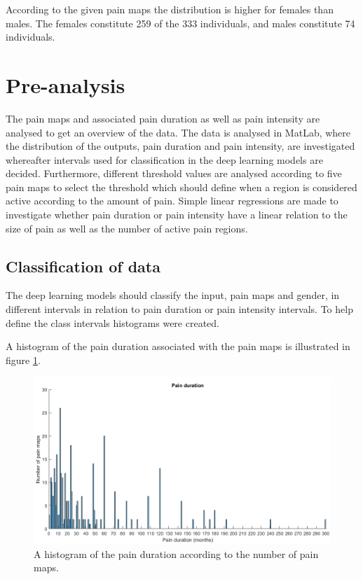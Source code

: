 \noindent
According to the given pain maps the distribution is higher for females than males. The females constitute 259 of the 333 individuals, and males constitute 74 individuals.  \newpage

\section{Pre-analysis}
The pain maps and associated pain duration as well as pain intensity are analysed to get an overview of the data. The data is analysed in MatLab, where the distribution of the outputs, pain duration and pain intensity, are investigated whereafter intervals used for classification in the deep learning models are decided. Furthermore, different threshold values are analysed according to five pain maps to select the threshold which should define when a region is considered active according to the amount of pain.
Simple linear regressions are made to investigate whether pain duration or pain intensity have a linear relation to the size of pain as well as the number of active pain regions.


\subsection{Classification of data}
The deep learning models should classify the input, pain maps and gender, in different intervals in relation to pain duration or pain intensity intervals. To help define the class intervals histograms were created.

\noindent
A histogram of the pain duration associated with the pain maps is illustrated in figure \ref{fig:histoduration}.

\begin{figure} [H]
\centering
\includegraphics[width=1\textwidth]{figures/histogramDuration}
\caption{A histogram of the pain duration according to the number of pain maps.}
\label{fig:histoduration}
\end{figure}

